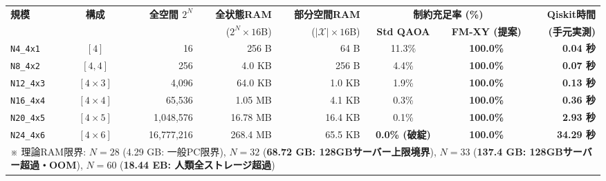 \documentclass[11pt,a4paper]{ltjsarticle}
\begin{document}
\vspace{-2mm}
\begin{center}
\label{tab:extreme_scaling}
\vspace{1mm}
\scriptsize
\setlength{\tabcolsep}{3.6pt}
\begin{tabular}{l c r r r c c r}
\toprule
\textbf{規模} & \textbf{構成} & \textbf{全空間 $2^N$} & \textbf{全状態RAM} & \textbf{部分空間RAM} & \multicolumn{2}{c}{\textbf{制約充足率 (\%)}} & \textbf{Qiskit時間} \\
\cmidrule(lr){6-7}
& & & ($2^N \times 16$B) & ($|\mathcal{X}| \times 16$B) & \textbf{Std QAOA} & \textbf{FM-XY (提案)} & \textbf{(手元実測)} \\
\midrule
\texttt{N4\_4x1}   & $[4]$         & 16                  & 256 B    & 64 B        & 11.3\%          & \textbf{100.0\%} & \textbf{0.04 秒} \\
\texttt{N8\_4x2}   & $[4,4]$       & 256                 & 4.0 KB   & 256 B       & 4.4\%           & \textbf{100.0\%} & \textbf{0.07 秒} \\
\texttt{N12\_4x3}  & $[4\times 3]$ & 4,096               & 64.0 KB  & 1.0 KB      & 1.9\%           & \textbf{100.0\%} & \textbf{0.13 秒} \\
\texttt{N16\_4x4}  & $[4\times 4]$ & 65,536              & 1.05 MB  & 4.1 KB      & 0.3\%           & \textbf{100.0\%} & \textbf{0.36 秒} \\
\texttt{N20\_4x5}  & $[4\times 5]$ & 1,048,576           & 16.78 MB & 16.4 KB     & 0.1\%           & \textbf{100.0\%} & \textbf{2.93 秒} \\
\texttt{N24\_4x6}  & $[4\times 6]$ & 16,777,216          & 268.4 MB & 65.5 KB     & \textbf{0.0\% (破綻)} & \textbf{100.0\%} & \textbf{34.29 秒} \\
\midrule
\multicolumn{8}{p{16.8cm}}{\scriptsize ※ 理論RAM限界: $N=28$ (4.29 GB: 一般PC限界), $N=32$ (\textbf{68.72 GB: 128GBサーバー上限境界}), $N=33$ (\textbf{137.4 GB: 128GBサーバー超過・OOM}), $N=60$ (\textbf{18.44 EB: 人類全ストレージ超過})} \\
\bottomrule
\end{tabular}
\end{center}

\vspace{-1.5mm}
\end{document}
